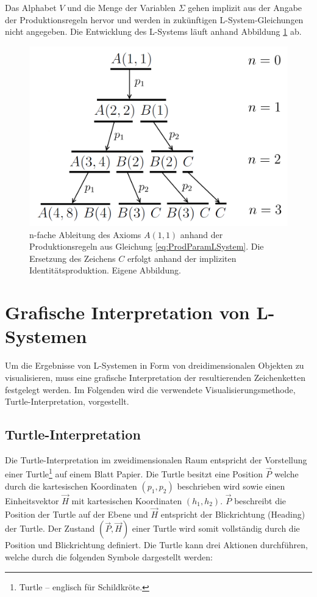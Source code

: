 Das Alphabet $V$ und die Menge der Variablen $\Sigma$ gehen implizit aus der Angabe der Produktionsregeln hervor und werden in zukünftigen L-System-Gleichungen nicht angegeben. Die Entwicklung des L-Systems läuft anhand Abbildung \ref{fig:ParamLSystemBeispiel} ab. 

\begin{figure} [hbtp]
	\centering
	\includegraphics[height=0.4\textheight]{images/ParamLSystemBeispiel.png}
	\caption{n-fache Ableitung des Axioms $A(1,1)$ anhand der Produktionsregeln aus Gleichung \ref{eq:ProdParamLSystem}. Die Ersetzung des Zeichens $C$ erfolgt anhand der impliziten Identitätsproduktion. Eigene Abbildung.}
	\label{fig:ParamLSystemBeispiel}
\end{figure}

\section{Grafische Interpretation von L-Systemen}

Um die Ergebnisse von L-Systemen in Form von dreidimensionalen Objekten zu visualisieren, muss eine grafische Interpretation der resultierenden Zeichenketten festgelegt werden. Im Folgenden wird die verwendete Visualisierungsmethode, Turtle-Interpretation, vorgestellt.

\subsection{Turtle-Interpretation}

Die Turtle-Interpretation im zweidimensionalen Raum entspricht der Vorstellung einer Turtle\footnote{\glqq Turtle\grqq{} -- englisch für \glqq Schildkröte\grqq.} auf einem Blatt Papier. Die Turtle besitzt eine Position $\overrightarrow{P}$ welche durch die kartesischen Koordinaten $(p_1,p_2)$ beschrieben wird sowie einen Einheitsvektor $\overrightarrow{H}$ mit kartesischen Koordinaten $(h_1, h_2)$. $\overrightarrow{P}$ beschreibt die Position der Turtle auf der Ebene und $\overrightarrow{H}$ entspricht der Blickrichtung (Heading) der Turtle. Der Zustand $(\overrightarrow{P},\overrightarrow{H})$ einer Turtle wird somit vollständig durch die Position und Blickrichtung definiert. \cite[S.2]{Turtle:04} Die Turtle kann drei Aktionen durchführen, welche durch die folgenden Symbole dargestellt werden:

